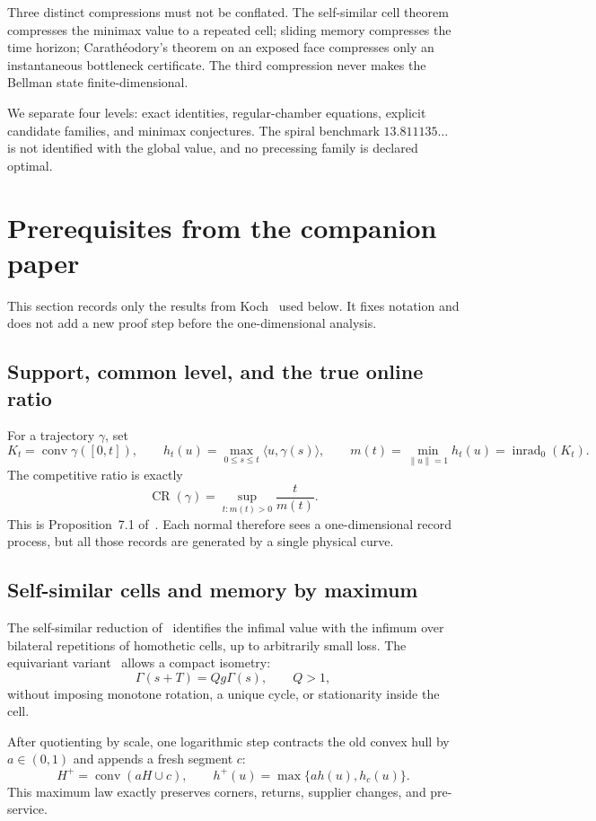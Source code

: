 \documentclass[10pt,a4paper]{article}
\newcommand{\conv}{\operatorname{conv}}
\newcommand{\inrad}{\operatorname{inrad}_{0}}
\newcommand{\CR}{\operatorname{CR}}
\theoremstyle{plain}
\theoremstyle{definition}
\theoremstyle{remark}
\begin{document}
Three distinct compressions must not be conflated. The self-similar cell theorem compresses the minimax value to a repeated cell; sliding memory compresses the time horizon; Carathéodory's theorem on an exposed face compresses only an instantaneous bottleneck certificate. The third compression never makes the Bellman state finite-dimensional.

We separate four levels: exact identities, regular-chamber equations, explicit candidate families, and minimax conjectures. The spiral benchmark $13.811135\ldots$ is not identified with the global value, and no precessing family is declared optimal.

\section{Prerequisites from the companion paper}

This section records only the results from Koch~\cite{koch-cell} used below. It fixes notation and does not add a new proof step before the one-dimensional analysis.

\subsection{Support, common level, and the true online ratio}

For a trajectory $\gamma$, set
\[
  K_t=\conv\gamma([0,t]),
  \qquad
  h_t(u)=\max_{0\le s\le t}\langle u,\gamma(s)\rangle,
  \qquad
  m(t)=\min_{\|u\|=1}h_t(u)=\inrad(K_t).
\]
The competitive ratio is exactly
\[
  \CR(\gamma)=\sup_{t:m(t)>0}\frac{t}{m(t)}.
\]
This is Proposition~7.1 of~\cite{koch-cell}. Each normal therefore sees a one-dimensional record process, but all those records are generated by a single physical curve.

\subsection{Self-similar cells and memory by maximum}

The self-similar reduction of~\cite[Theorems~4.1 and~5.1]{koch-cell} identifies the infimal value with the infimum over bilateral repetitions of homothetic cells, up to arbitrarily small loss. The equivariant variant~\cite[Corollary~6.1]{koch-cell} allows a compact isometry:
\[
  \Gamma(s+T)=Qg\Gamma(s),
  \qquad Q>1,
\]
without imposing monotone rotation, a unique cycle, or stationarity inside the cell.

After quotienting by scale, one logarithmic step contracts the old convex hull by $a\in(0,1)$ and appends a fresh segment $c$:
\[
  H^+=\conv(aH\cup c),
  \qquad
  h^+(u)=\max\{a h(u),h_c(u)\}.
\]
This maximum law exactly preserves corners, returns, supplier changes, and pre-service.
\end{document}
